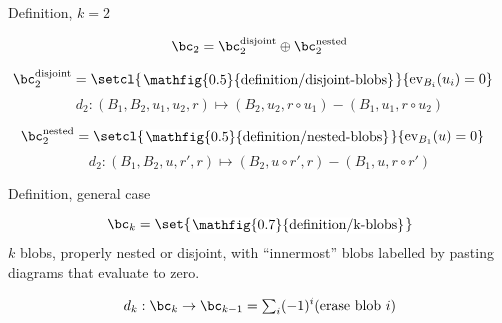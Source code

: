\documentclass[beamer, compress]{beamer}
\begin{document}
\begin{frame}{Definition, $k=2$}
\begin{block}{}
\vspace{-1mm}
$$\bc_2 = \bc_2^{\text{disjoint}} \oplus \bc_2^{\text{nested}}$$
\end{block}
\begin{block}{}
\vspace{-5mm}
\begin{align*}
\bc_2^{\text{disjoint}} & =  \setcl{\roundframe{\mathfig{0.5}{definition/disjoint-blobs}}}{\text{ev}_{B_i}(u_i) = 0}
\end{align*}
\vspace{-4mm}
$$d_2 : (B_1, B_2, u_1, u_2, r) \mapsto (B_2, u_2, r \circ u_1) - (B_1, u_1, r \circ u_2)$$
\end{block}
\begin{block}{}
\vspace{-5mm}
\begin{align*}
\bc_2^{\text{nested}} & = \setcl{\roundframe{\mathfig{0.5}{definition/nested-blobs}}}{\text{ev}_{B_1}(u)=0}
\end{align*}
\vspace{-4mm}
$$d_2 : (B_1, B_2, u, r', r) \mapsto (B_2, u \circ r', r) - (B_1, u, r \circ r')$$
\end{block}
\end{frame}

\begin{frame}{Definition, general case}
\begin{block}{}
$$\bc_k = \set{\roundframe{\mathfig{0.7}{definition/k-blobs}}}$$
$k$ blobs, properly nested or disjoint, with ``innermost'' blobs labelled by pasting diagrams that evaluate to zero.
\end{block}
\begin{block}{}
\vspace{-2mm}
$$d_k : \bc_k \to \bc_{k-1} = {\textstyle \sum_i} (-1)^i (\text{erase blob $i$})$$
\end{block}
\end{frame}
\end{document}
